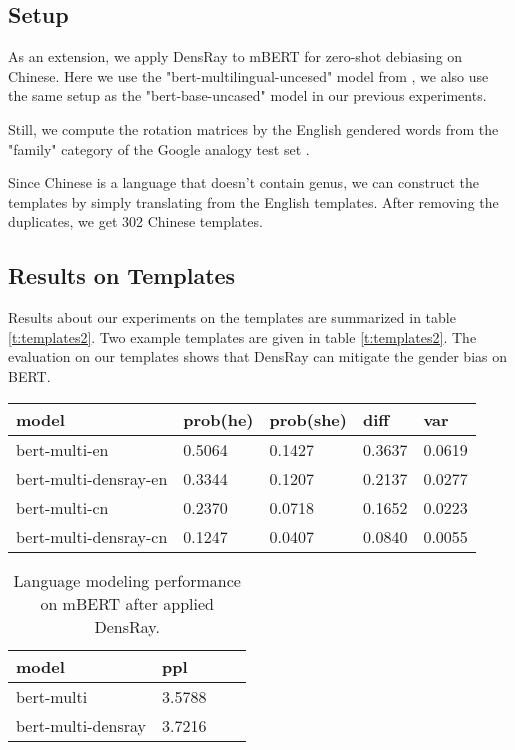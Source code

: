 \subsection{Setup}
As an extension, we apply DensRay to mBERT for zero-shot debiasing on Chinese. Here we use the "bert-multilingual-uncesed" model from \citep{wolf2019huggingfaces}, we also use the same setup as the "bert-base-uncased" model in our previous experiments. 

Still, we compute the rotation matrices by the English gendered words from the "family" category of the Google analogy test set \citep{mikolov2013efficient}.

Since Chinese is a language that doesn't contain genus, we can construct the templates by simply translating from the English templates. After removing the duplicates, we get 302 Chinese templates.

\subsection{Results on Templates}
Results about our experiments on the templates are summarized in table \ref{t:templates2}. Two example templates are given in table \ref{t:templates2}. The evaluation on our templates shows that DensRay can mitigate the gender bias on BERT.
\begin{table*}[ht]
\centering
\begin{tabular}{lllll}
\hline
model & prob(he) & prob(she) & diff & var\\
\hline
bert-multi-en & 0.5064 & 0.1427 & 0.3637 & 0.0619 \\
bert-multi-densray-en & 0.3344 & 0.1207 & 0.2137 & 0.0277 \\
bert-multi-cn & 0.2370 & 0.0718 & 0.1652 & 0.0223 \\
bert-multi-densray-cn & 0.1247 & 0.0407 & 0.0840 & 0.0055\\
\hline
\end{tabular}
\caption{\label{t:templates2}
Results of templates on mBERT after applied DensRay. Models with \textit{-en} are tested on our English templates, and those with \textit{-cn} are tested on our Chinese templates.}
\end{table*}

\begin{table}[ht]
\centering
\begin{tabular}{llll}
\hline
model & ppl\\
\hline
bert-multi & 3.5788\\
bert-multi-densray & 3.7216\\
\hline
\end{tabular}
\caption{\label{t:ppl2}
Language modeling performance on mBERT after applied DensRay.}
\end{table}

